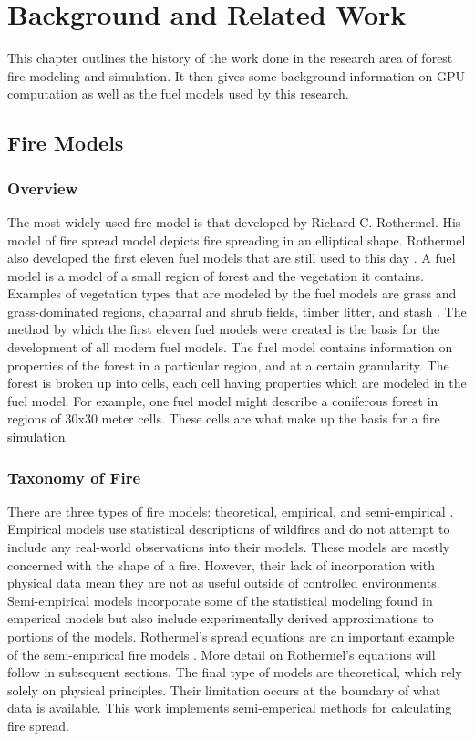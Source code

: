 \chapter{Background and Related Work}
\label{chapter:background}
This chapter outlines the history of the work done in the research area of forest fire modeling and simulation. It then gives some background information on GPU computation as well as the fuel models used by this research.

\section{Fire Models}
\subsection{Overview}
The most widely used fire model is that developed by Richard C. Rothermel. His model of fire spread model depicts fire spreading in an elliptical shape. Rothermel also developed the first eleven fuel models that are still used to this day \cite{roth}. A fuel model is a model of a small region of forest and the vegetation it contains. Examples of vegetation types that are modeled by the fuel models are grass and grass-dominated regions, chaparral and shrub fields, timber litter, and stash \cite{1983roth}. The method by which the first eleven fuel models were created is the basis for the development of all modern fuel models. The fuel model contains information on properties of the forest in a particular region, and at a certain granularity. The forest is broken up into cells, each cell having properties which are modeled in the fuel model. For example, one fuel model might describe a coniferous forest in regions of 30x30 meter cells. These cells are what make up the basis for a fire simulation. 

\subsection{Taxonomy of Fire}
There are three types of fire models: theoretical, empirical, and semi-empirical \cite{firereview}\cite{firereview2}. Empirical models use statistical descriptions of wildfires and do not attempt to include any real-world observations into their models. These models are mostly concerned with the shape of a fire. However, their lack of incorporation with physical data mean they are not as useful outside of controlled environments. Semi-empirical models incorporate some of the statistical modeling found in emperical models but also include experimentally derived approximations to portions of the models. Rothermel's spread equations are an important example of the semi-empirical fire models \cite{roth}. More detail on Rothermel's equations will follow in subsequent sections. The final type of models are theoretical, which rely solely on physical principles. Their limitation occurs at the boundary of what data is available. This work implements semi-emperical methods for calculating fire spread.

